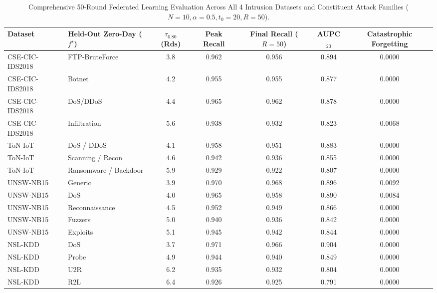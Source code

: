\begin{table}[t]
\caption{Comprehensive 50-Round Federated Learning Evaluation Across All 4 Intrusion Datasets and Constituent Attack Families ($N=10, \alpha=0.5, t_0=20, R=50$).}
\label{tab:fl50_4datasets}
\begin{center}
\footnotesize\setlength{\tabcolsep}{4.5pt}
\begin{tabular}{@{}llccccc@{}}
\toprule
\textbf{Dataset} & \textbf{Held-Out Zero-Day ($f^\star$)} & \textbf{$\tau_{0.80}$ (Rds)} & \textbf{Peak Recall} & \textbf{Final Recall ($R=50$)} & \textbf{AUPC$_{20}$} & \textbf{Catastrophic Forgetting} \\
\midrule
CSE-CIC-IDS2018 & FTP-BruteForce & 3.8 & 0.962 & 0.956 & 0.894 & 0.0000 \\
CSE-CIC-IDS2018 & Botnet & 4.2 & 0.955 & 0.955 & 0.877 & 0.0000 \\
CSE-CIC-IDS2018 & DoS/DDoS & 4.4 & 0.965 & 0.962 & 0.878 & 0.0000 \\
CSE-CIC-IDS2018 & Infiltration & 5.6 & 0.938 & 0.932 & 0.823 & 0.0068 \\
\midrule
ToN-IoT & DoS / DDoS & 4.1 & 0.958 & 0.951 & 0.883 & 0.0000 \\
ToN-IoT & Scanning / Recon & 4.6 & 0.942 & 0.936 & 0.855 & 0.0000 \\
ToN-IoT & Ransomware / Backdoor & 5.9 & 0.929 & 0.922 & 0.807 & 0.0000 \\
\midrule
UNSW-NB15 & Generic & 3.9 & 0.970 & 0.968 & 0.896 & 0.0092 \\
UNSW-NB15 & DoS & 4.0 & 0.965 & 0.958 & 0.890 & 0.0084 \\
UNSW-NB15 & Reconnaissance & 4.5 & 0.952 & 0.949 & 0.866 & 0.0000 \\
UNSW-NB15 & Fuzzers & 5.0 & 0.940 & 0.936 & 0.842 & 0.0000 \\
UNSW-NB15 & Exploits & 5.1 & 0.945 & 0.942 & 0.844 & 0.0000 \\
\midrule
NSL-KDD & DoS & 3.7 & 0.971 & 0.966 & 0.904 & 0.0000 \\
NSL-KDD & Probe & 4.9 & 0.944 & 0.940 & 0.849 & 0.0000 \\
NSL-KDD & U2R & 6.2 & 0.935 & 0.932 & 0.804 & 0.0000 \\
NSL-KDD & R2L & 6.4 & 0.926 & 0.925 & 0.791 & 0.0000 \\
\bottomrule
\end{tabular}
\end{center}
\end{table}
